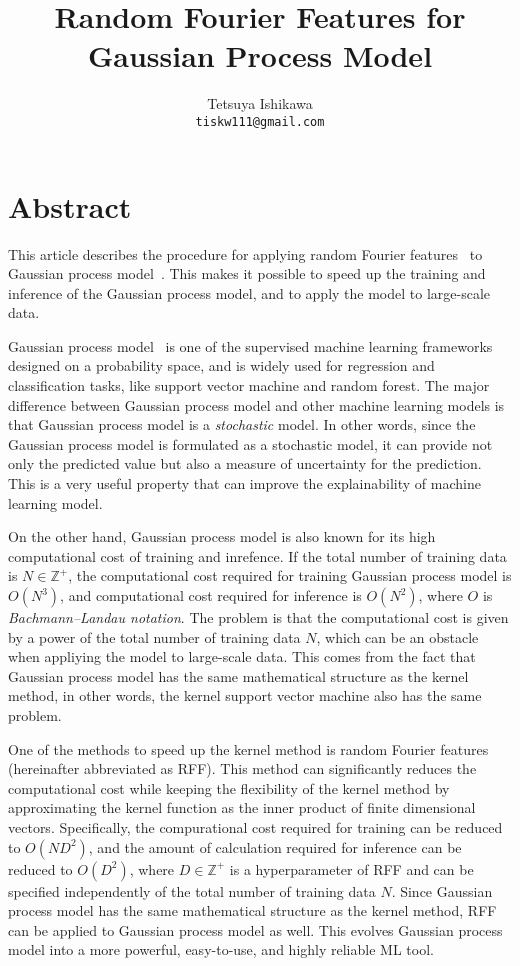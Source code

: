 \documentclass[twocolumn,a4paper,10pt]{article}
\begin{document}
\title{Random Fourier Features for Gaussian Process Model}
\author{Tetsuya Ishikawa \\ \normalsize\texttt{tiskw111@gmail.com}}
\maketitle
\thispagestyle{fancy}

\section*{Abstract}\titlebar

This article describes the procedure for applying random Fourier features~\cite{Rahimi2007}
to Gaussian process model~\cite{Rasmussen2006}. This makes it possible to speed up the training
and inference of the Gaussian process model, and to apply the model to large-scale data.

Gaussian process model~\cite{Rasmussen2006} is one of the supervised machine learning frameworks
designed on a probability space, and is widely used for regression and classification tasks, like
support vector machine and random forest. The major difference between Gaussian process model and
other machine learning models is that Gaussian process model is a \textit{stochastic} model.
In other words, since the Gaussian process model is formulated as a stochastic model,
it can provide not only the predicted value but also a measure of uncertainty for the prediction.
This is a very useful property that can improve the explainability of machine learning model.

On the other hand, Gaussian process model is also known for its high computational cost
of training and inrefence. If the total number of training data is $N \in \mathbb{Z}^{+}$,
the computational cost required for training Gaussian process model is $O(N^3)$, and
computational cost required for inference is $O(N^2)$, where $O$ is \textit{Bachmann–Landau notation}.
The problem is that the computational cost is given by a power of the total number of training data $N$,
which can be an obstacle when appliying the model to large-scale data.
This comes from the fact that Gaussian process model has the same mathematical structure as
the kernel method, in other words, the kernel support vector machine also has the same problem.

One of the methods to speed up the kernel method is random Fourier features~\cite{Rahimi2007}
(hereinafter abbreviated as RFF). This method can significantly reduces the computational cost
while keeping the flexibility of the kernel method by approximating the kernel function as the inner
product of finite dimensional vectors. Specifically, the compurational cost required for training
can be reduced to $O(N D^2)$, and the amount of calculation required for inference can be reduced
to $O(D^2)$, where $D \in \mathbb{Z}^{+}$ is a hyperparameter of RFF and can be specified
independently of the total number of training data $N$.
Since Gaussian process model has the same mathematical structure as the kernel method,
RFF can be applied to Gaussian process model as well. This evolves Gaussian process model
into a more powerful, easy-to-use, and highly reliable ML tool.
\end{document}
